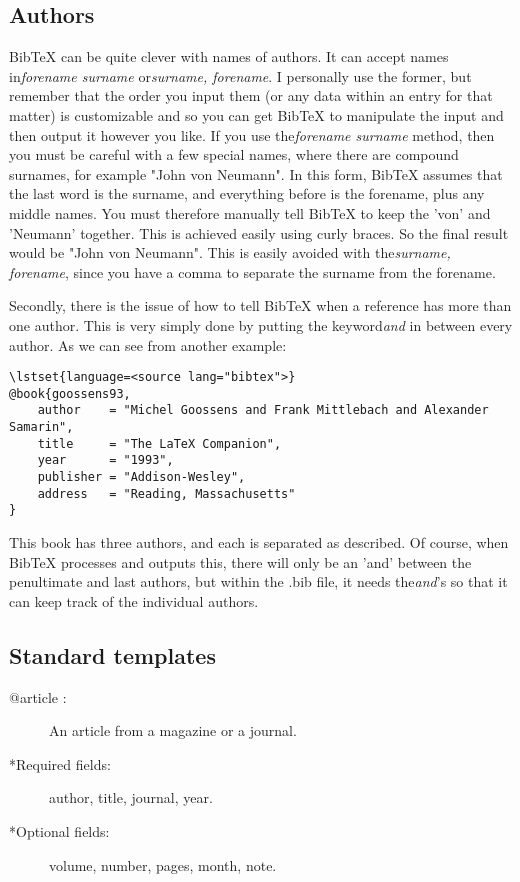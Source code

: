 \subsection{Authors}
BibTeX can be quite clever with names of authors. It can accept names in\textit{forename surname} or\textit{surname, forename}. I personally use the former, but remember that the order you input them (or any data within an entry for that matter) is customizable and so you can get BibTeX to manipulate the input and then output it however you like. If you use the\textit{forename surname} method, then you must be careful with a few special names, where there are compound surnames, for example "John von Neumann". In this form, BibTeX assumes that the last word is the surname, and everything before is the forename, plus any middle names. You must therefore manually tell BibTeX to keep the 'von' and 'Neumann' together. This is achieved easily using curly braces. So the final result would be "John {von Neumann}".  This is easily avoided with the\textit{surname, forename}, since you have a comma to separate the surname from the forename.

Secondly, there is the issue of how to tell BibTeX when a reference has more than one author. This is very simply done by putting the keyword\textit{and} in between every author. As we can see from another example:

\begin{lstlisting}
\lstset{language=<source lang="bibtex">}
@book{goossens93,
    author    = "Michel Goossens and Frank Mittlebach and Alexander Samarin",
    title     = "The LaTeX Companion",
    year      = "1993",
    publisher = "Addison-Wesley",
    address   = "Reading, Massachusetts"
}
\end{lstlisting}
This book has three authors, and each is separated as described. Of course,
when BibTeX processes and outputs this, there will only be an 'and' between the
penultimate and last authors, but within the .bib file, it needs
the\textit{and}'s so that it can keep track of the individual authors.

\subsection{Standard templates}
\begin{description}
\item[@article :] An article from a magazine or a journal.
\item[*Required fields:] author, title, journal, year.
\item[*Optional fields:] volume, number, pages, month, note.
\end{description}

